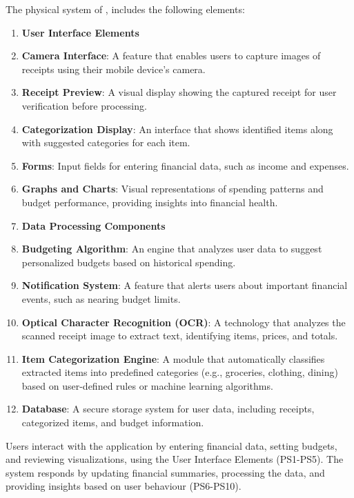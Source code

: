 \documentclass[12pt]{article}
\begin{document}
The physical system of \progname{}, includes the following elements: \\

\noindent
\begin{enumerate}[label=PS\arabic*]
  \item[] \textbf{User Interface Elements}
  \item \textbf{Camera Interface}: A feature that enables users to capture
  images of receipts using their mobile device’s camera.
  \item \textbf{Receipt Preview}: A visual display showing the captured
  receipt for user verification before processing.
  \item \textbf{Categorization Display}: An interface that shows identified
  items along with suggested categories for each item.
  \item \textbf{Forms}: Input fields for entering financial data, such as
  income and expenses.
  \item \textbf{Graphs and Charts}: Visual representations of spending
  patterns and budget performance, providing insights into financial health.

  \item[] \textbf{Data Processing Components}
  \item \textbf{Budgeting Algorithm}: An engine that analyzes user data to
  suggest personalized budgets based on historical spending.
  \item \textbf{Notification System}: A feature that alerts users about
  important financial events, such as nearing budget limits.
  \item \textbf{Optical Character Recognition (OCR)}: A technology that
  analyzes the scanned receipt image to extract text, identifying items, prices,
  and totals.
  \item \textbf{Item Categorization Engine}: A module that automatically
  classifies extracted items into predefined categories (e.g., groceries,
  clothing, dining) based on user-defined rules or machine learning algorithms.
  \item \textbf{Database}: A secure storage system for user data, including
  receipts, categorized items, and budget information.
\end{enumerate}

Users interact with the application by entering financial data, setting budgets,
  and reviewing visualizations, using the User Interface Elements (PS1-PS5).
  The system responds by updating financial summaries, processing the
  data, and providing insights based on user behaviour (PS6-PS10).
\end{document}
